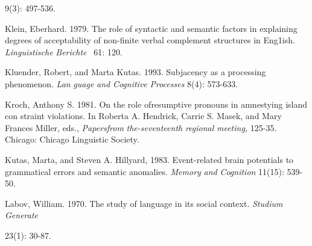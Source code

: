 \begin{styleStandard}
9(3): 497-536.
\end{styleStandard}


\begin{styleStandard}
Klein, Eberhard. 1979. The role of syntactic and semantic factors in explaining degrees of acceptability of non-finite verbal complement structures in Eng1ish. \textit{Linguistische}\textit{ }\textit{Berichte }\textit{\ }61: 120.
\end{styleStandard}


\begin{styleStandard}
Kluender, Robert, and Marta Kutas. 1993. Subjacency as a processing phenomenon. \textit{Lan\-}\textit{ }\textit{guage}\textit{ }\textit{and}\textit{ }\textit{Cognitive}\textit{ }\textit{Processes}\textit{ }8(4): 573-633.
\end{styleStandard}


\begin{styleStandard}
Kroch, Anthony S. 1981. On the role ofresumptive pronouns in amnestying island con\- straint violations. In Roberta A. Hendrick, Carrie S. Masek, and Mary Frances Miller, eds., \textit{Papersfrom}\textit{ }\textit{the-seventeenth}\textit{ }\textit{regional}\textit{ }\textit{meeting,}\textit{ }125-35. Chicago: Chicago Linguistic Society.
\end{styleStandard}


\begin{styleStandard}
Kutas, Marta, and Steven A. Hillyard, 1983. Event-related brain potentials to grammatical errors and semantic anomalies. \textit{Memory}\textit{ }\textit{and}\textit{ }\textit{Cognition}\textit{ }11(15): 539-50.
\end{styleStandard}


\begin{styleStandard}
Labov, William. 1970. The study of language in its social context. \textit{Studium}\textit{ }\textit{Generate}
\end{styleStandard}


\begin{styleStandard}
23(1): 30-87.
\end{styleStandard}


